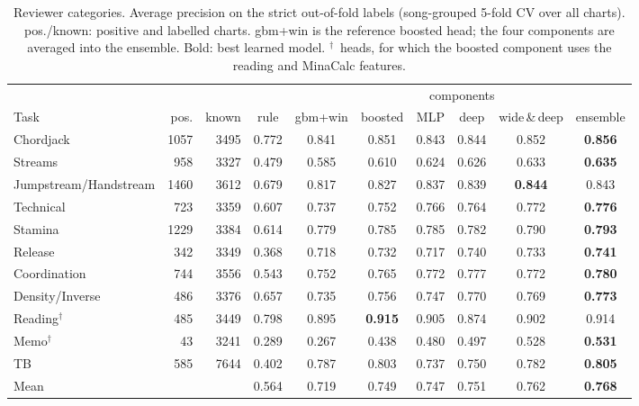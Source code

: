 \begin{table}[t]
\centering\small
\caption{Reviewer categories. Average precision on the strict out-of-fold labels (song-grouped 5-fold CV over all charts). pos./known: positive and labelled charts. gbm+win is the reference boosted head; the four components are averaged into the ensemble. Bold: best learned model. $^\dagger$\,\SV{} heads, for which the boosted component uses the reading and MinaCalc features.}
\label{tab:v2-cats}
\begin{tabular}{lrrccccccc}
\toprule
& & & & & \multicolumn{4}{c}{components} & \\ \cmidrule(lr){6-9}
Task & pos. & known & rule & gbm+win & boosted & MLP & deep & wide\,\&\,deep & ensemble \\
\midrule
Chordjack & 1057 & 3495 & 0.772 & 0.841 & 0.851 & 0.843 & 0.844 & 0.852 & \textbf{0.856} \\
Streams & 958 & 3327 & 0.479 & 0.585 & 0.610 & 0.624 & 0.626 & 0.633 & \textbf{0.635} \\
Jumpstream/Handstream & 1460 & 3612 & 0.679 & 0.817 & 0.827 & 0.837 & 0.839 & \textbf{0.844} & 0.843 \\
Technical & 723 & 3359 & 0.607 & 0.737 & 0.752 & 0.766 & 0.764 & 0.772 & \textbf{0.776} \\
Stamina & 1229 & 3384 & 0.614 & 0.779 & 0.785 & 0.785 & 0.782 & 0.790 & \textbf{0.793} \\
Release & 342 & 3349 & 0.368 & 0.718 & 0.732 & 0.717 & 0.740 & 0.733 & \textbf{0.741} \\
Coordination & 744 & 3556 & 0.543 & 0.752 & 0.765 & 0.772 & 0.777 & 0.772 & \textbf{0.780} \\
Density/Inverse & 486 & 3376 & 0.657 & 0.735 & 0.756 & 0.747 & 0.770 & 0.769 & \textbf{0.773} \\
Reading$^\dagger$ & 485 & 3449 & 0.798 & 0.895 & \textbf{0.915} & 0.905 & 0.874 & 0.902 & 0.914 \\
Memo$^\dagger$ & 43 & 3241 & 0.289 & 0.267 & 0.438 & 0.480 & 0.497 & 0.528 & \textbf{0.531} \\
TB & 585 & 7644 & 0.402 & 0.787 & 0.803 & 0.737 & 0.750 & 0.782 & \textbf{0.805} \\
\midrule
Mean & & & 0.564 & 0.719 & 0.749 & 0.747 & 0.751 & 0.762 & \textbf{0.768} \\
\bottomrule
\end{tabular}
\end{table}
